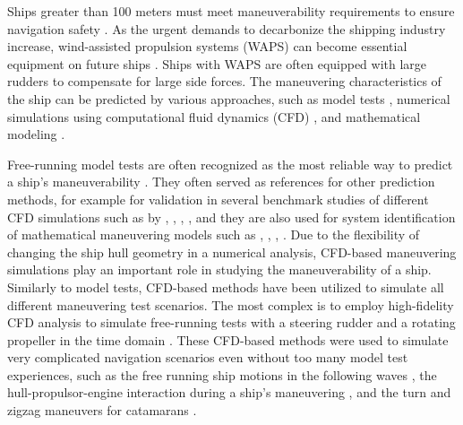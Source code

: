 Ships greater than 100 meters must meet maneuverability requirements to ensure navigation safety \citep{imoStandardsShipManoeuvrability2002}. As the urgent demands to decarbonize the shipping industry increase, wind-assisted propulsion systems (WAPS) can become essential equipment on future ships \citep{nelissenStudyAnalysisMarket2016}. Ships with WAPS are often equipped with large rudders to compensate for large side forces. The maneuvering characteristics of the ship can be predicted by various approaches, such as model tests \citep{ittcManeuveringCommitteeITTC2008}, numerical simulations using computational fluid dynamics (CFD) \citep{elmoctarRANSBasedSimulatedShip2014,dumanTurnZigzagManoeuvres2022}, and mathematical modeling \citep{abkowitzMEASUREMENTHYDRODYNAMICCHARACTERISTICS1980,fossenHandbookMarineCraft2011,yasukawaIntroductionMMGStandard2015,alexanderssonSystemIdentificationPhysicsinformed2024b}. 

Free-running model tests are often recognized as the most reliable way to predict a ship's maneuverability \citep{ittcITTCRecommendedProcedures2008}. They often served as references for other prediction methods, for example for validation in several benchmark studies of different CFD simulations such as by \citet{sternExperienceSIMMAN20082011}, \citet{sakamotoURANSSimulationsStatic2012}, \citet{yoonBenchmarkCFDValidation2015a}, \citet{yasukawaValidation6DOFMotion2021}, and they are also used for system identification of mathematical maneuvering models such as \citet{luoParameterIdentificationShip2016}, \citet{xuUncertaintyAnalysisHydrodynamic2019}, \citet{wangOptimalDesignExcitation2020}, \citet{alexanderssonSystemIdentificationVessel2022}. Due to the flexibility of changing the ship hull geometry in a numerical analysis, CFD-based maneuvering simulations play an important role in studying the maneuverability of a ship. Similarly to model tests, CFD-based methods have been utilized to simulate all different maneuvering test scenarios. The most complex is to employ high-fidelity CFD analysis to simulate free-running tests with a steering rudder and a rotating propeller in the time domain \citep{dubbiosoTurningAbilityAnalysis2016a, islamEstimationHydrodynamicDerivatives2018}. These CFD-based methods were used to simulate very complicated navigation scenarios even without too many model test experiences, such as the free running ship motions in the following waves \citep{arakiImprovedManeuveringBasedMathematical2019}, the hull-propulsor-engine interaction during a ship’s maneuvering \citep{elmoctarRANSBasedSimulatedShip2014}, and the turn and zigzag maneuvers for catamarans \citep{dumanTurnZigzagManoeuvres2022}.

